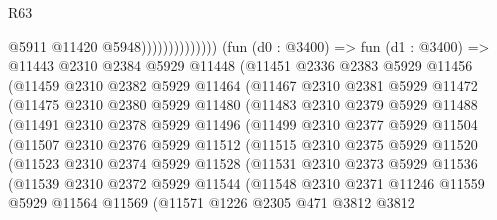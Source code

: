 \begin{lexlean}{R63}
\begin{coremodule}
                                    @5911
                                    @11420
                                    @5948))))))))))))))
        (fun (d0 : @3400) =>
        fun (d1 : @3400) =>
        @11443
          @2310
          @2384
          @5929
          @11448
          (@11451
            @2336
            @2383
            @5929
            @11456
            (@11459
              @2310
              @2382
              @5929
              @11464
              (@11467
                @2310
                @2381
                @5929
                @11472
                (@11475
                  @2310
                  @2380
                  @5929
                  @11480
                  (@11483
                    @2310
                    @2379
                    @5929
                    @11488
                    (@11491
                      @2310
                      @2378
                      @5929
                      @11496
                      (@11499
                        @2310
                        @2377
                        @5929
                        @11504
                        (@11507
                          @2310
                          @2376
                          @5929
                          @11512
                          (@11515
                            @2310
                            @2375
                            @5929
                            @11520
                            (@11523
                              @2310
                              @2374
                              @5929
                              @11528
                              (@11531
                                @2310
                                @2373
                                @5929
                                @11536
                                (@11539
                                  @2310
                                  @2372
                                  @5929
                                  @11544
                                  (@11548
                                    @2310
                                    @2371
                                    @11246
                                    @11559
                                    @5929
                                    @11564
                                    @11569
                                    (@11571
                                      @1226
                                      @2305
                                      @471
                                      @3812
                                      @3812

\end{coremodule}
\end{lexlean}
